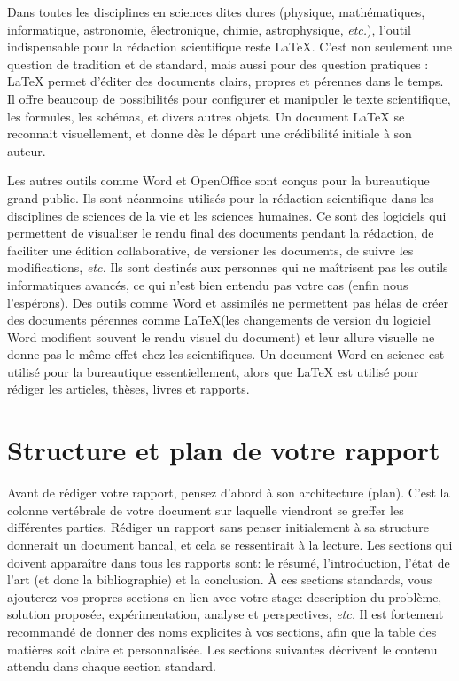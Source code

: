 \documentclass{rapport}
\def\Latex{\LaTeX\xspace}
\def\etc{\textit{etc.}\xspace}
\begin{document}
      Dans toutes les disciplines en sciences dites dures (physique, mathématiques, informatique, astronomie, électronique, chimie, astrophysique, \etc), l'outil indispensable pour la rédaction scientifique reste \Latex. C'est non seulement une question de tradition et de standard, mais aussi pour des question pratiques : \Latex permet d'éditer des documents clairs, propres et pérennes dans le temps. Il offre beaucoup de possibilités pour configurer et manipuler le texte scientifique, les formules, les schémas, et divers autres objets. Un document \Latex se reconnait visuellement, et donne dès le départ une crédibilité initiale à son auteur.
      
      Les autres outils comme Word et OpenOffice sont conçus pour la bureautique grand public. Ils sont néanmoins utilisés pour la rédaction scientifique dans les disciplines de sciences de la vie et les sciences humaines. Ce sont des logiciels qui permettent de visualiser le rendu final des documents pendant la rédaction, de faciliter une édition collaborative, de versioner les documents, de suivre les modifications, \etc Ils sont destinés aux personnes qui ne maîtrisent pas les outils informatiques avancés, ce qui n'est bien entendu pas votre cas (enfin nous l'espérons). Des outils comme Word et assimilés ne permettent pas hélas de créer des documents pérennes comme \Latex (les changements de version du logiciel Word modifient souvent le rendu visuel du document) et leur allure visuelle ne donne pas le même effet chez les scientifiques. Un document Word en science est utilisé pour la bureautique essentiellement, alors que \Latex est utilisé pour rédiger les articles, thèses, livres et rapports.
      
    \section{Structure et plan de votre rapport} 
    
      Avant de rédiger votre rapport, pensez d'abord à son architecture (plan). C'est la colonne vertébrale de votre document sur laquelle viendront se greffer les différentes parties. Rédiger un rapport sans penser initialement à sa structure donnerait un document bancal, et cela se ressentirait à la lecture. Les sections qui doivent apparaître dans tous les rapports sont: le résumé, l'introduction, l'état de l'art (et donc la bibliographie) et la conclusion. À ces sections standards, vous ajouterez vos propres sections en lien avec votre stage: description du problème, solution proposée, expérimentation, analyse et perspectives, \etc Il est fortement recommandé de donner des noms explicites à vos sections, afin que la table des matières soit claire et personnalisée. %
      Les sections suivantes décrivent le contenu attendu dans chaque section standard. 
      
\end{document}
